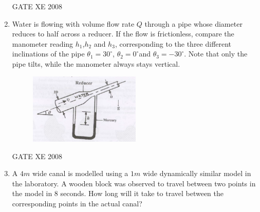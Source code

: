 \documentclass[12pt]{article}
\begin{document}
\begin{enumerate}
\begin{enumerate}
\end{enumerate}

GATE XE 2008
\item Water is flowing with volume flow rate $Q$ through a pipe whose diameter reduces to half across a reducer. If the flow is frictionless, compare the manometer reading $h_1$,$h_2$ and $h_3$, corresponding to the three different inclinations of the pipe $\theta _1 = 30^{\circ}$, $\theta _2 = 0^{\circ}$and $\theta _3 =-30^{\circ}$. Note that only the pipe tilts, while the manometer always stays vertical.

\begin{figure}[H]
\centering
  \includegraphics[width=0.5\textwidth]{figs/ass1_d_q18.png}
  \caption{}
\end{figure} 

\begin{enumerate}
\end{enumerate}

GATE XE 2008
\item A $4 m$ wide canal is modelled using a $1 m$ wide dynamically similar model in the laboratory. A wooden block was observed to travel between two points in the model in $8$ seconds. How long will it take to travel between the corresponding points in the actual canal?

\begin{enumerate}
\end{enumerate}


\end{enumerate}
\end{document}
